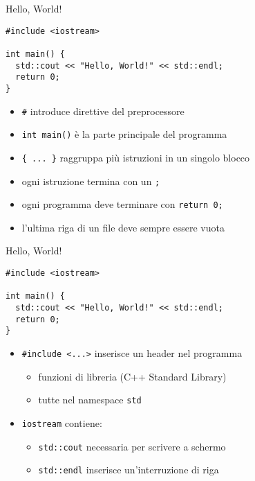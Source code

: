\documentclass[xcolor=dvipsnames,handout]{beamer}
\begin{document}
\begin{frame}[fragile]{Hello, World!}
  \vfill
  \begin{lstlisting}
#include <iostream>

int main() {
  std::cout << "Hello, World!" << std::endl;
  return 0;
}
  \end{lstlisting}
  \vfill
  \begin{itemize}
    \item \lstinline$#$ introduce direttive del preprocessore
    \vfill
    \item \lstinline$int main()$ è la parte principale del programma
    \vfill
    \item \lstinline${ ... }$ raggruppa più istruzioni in un singolo blocco
    \vfill
    \item ogni istruzione termina con un \lstinline$;$
    \vfill
    \item ogni programma deve terminare con \lstinline$return 0;$
    \vfill
    \item l'ultima riga di un file deve sempre essere vuota
  \end{itemize}
  \vfill
\end{frame}

\begin{frame}[fragile]{Hello, World!}
  \vfill
  \begin{lstlisting}
#include <iostream>

int main() {
  std::cout << "Hello, World!" << std::endl;
  return 0;
}
  \end{lstlisting}
  \vfill
  \begin{itemize}
    \item \lstinline$#include <...>$ inserisce un \alert{header} nel programma
    \begin{itemize}
      \item funzioni di libreria (C++ Standard Library)
      \item tutte nel \alert{namespace} \lstinline$std$
    \end{itemize}
    \vfill
    \item \lstinline$iostream$ contiene:
    \begin{itemize}
      \item \lstinline$std::cout$ necessaria per scrivere a schermo
      \item \lstinline$std::endl$ inserisce un'interruzione di riga
    \end{itemize}
  \end{itemize}
  \vfill
\end{frame}
\end{document}
